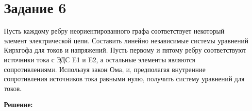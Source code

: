 \section*{Задание 6}

Пусть каждому ребру неориентированного графа соответствует некоторый элемент электрической цепи. Составить линейно независимые системы уравнений Кирхгофа для токов и напряжений. Пусть первому и пятому ребру соответствуют источники тока с ЭДС E1 и E2, а остальные элементы являются сопротивлениями. Используя закон Ома, и, предполагая внутренние сопротивления источников тока равными нулю, получить систему уравнений для токов.



{\large\textbf{Решение:}}


